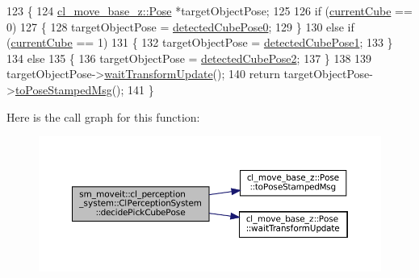 \begin{DoxyCode}
123     \{
124         \hyperlink{classcl__move__base__z_1_1Pose}{cl\_move\_base\_z::Pose} *targetObjectPose;
125 
126         \textcolor{keywordflow}{if} (\hyperlink{classsm__moveit_1_1cl__perception__system_1_1ClPerceptionSystem_a0ffeadfa41480c9d4d0fcc509237dff6}{currentCube} == 0)
127         \{
128             targetObjectPose = \hyperlink{classsm__moveit_1_1cl__perception__system_1_1ClPerceptionSystem_a4bf0838041a73d41008c2cb2daa6fb63}{detectedCubePose0};
129         \}
130         \textcolor{keywordflow}{else} \textcolor{keywordflow}{if} (\hyperlink{classsm__moveit_1_1cl__perception__system_1_1ClPerceptionSystem_a0ffeadfa41480c9d4d0fcc509237dff6}{currentCube} == 1)
131         \{
132             targetObjectPose = \hyperlink{classsm__moveit_1_1cl__perception__system_1_1ClPerceptionSystem_ae09f06cb609d0a233fa9a0d31dcb09c6}{detectedCubePose1};
133         \}
134         \textcolor{keywordflow}{else}
135         \{
136             targetObjectPose = \hyperlink{classsm__moveit_1_1cl__perception__system_1_1ClPerceptionSystem_a92801878ea69fb584f459a502bb77dad}{detectedCubePose2};
137         \}
138 
139         targetObjectPose->\hyperlink{classcl__move__base__z_1_1Pose_a5f8576c3dacfb2f2e7f9df5105c480ea}{waitTransformUpdate}();
140         \textcolor{keywordflow}{return} targetObjectPose->\hyperlink{classcl__move__base__z_1_1Pose_a63887a88c1ac6e9a4a71b8d7d11aed6c}{toPoseStampedMsg}();
141     \}
\end{DoxyCode}
Here is the call graph for this function\+:
\nopagebreak
\begin{figure}[H]
\begin{center}
\leavevmode
\includegraphics[width=350pt]{classsm__moveit_1_1cl__perception__system_1_1ClPerceptionSystem_a29beb46b44dbf5617027a6d0e3990037_cgraph}
\end{center}
\end{figure}
\mbox{\label{classsm__moveit_1_1cl__perception__system_1_1ClPerceptionSystem_a354f357ec7bc5438e7eeab2006868261}} 
